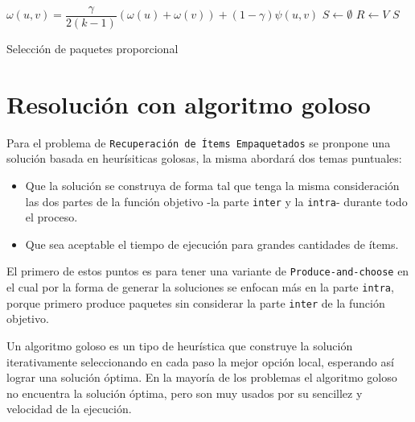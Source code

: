 \begin{center}
	\begin{algorithm}[H]
	\DontPrintSemicolon
	\SetAlgoLined
		$\omega(u,v) = \dfrac{\gamma}{2( k - 1)} (\omega(u) + \omega(v)) + (1 - \gamma)\psi(u,v)$\;
		$S \leftarrow \emptyset$\;
		$R \leftarrow V$\;
		\Return $S$\;
	\caption{Selección de paquetes proporcional}\label{alg:algSelProp}
	\end{algorithm}
\end{center}

\section{Resolución con algoritmo goloso}

Para el problema de \texttt{Recuperación de Ítems Empaquetados} se pronpone una solución basada en heurísiticas golosas, la misma abordará dos temas puntuales:
\begin{itemize}
	\item Que la solución se construya de forma tal que tenga la misma consideración las dos partes de la función objetivo -la parte \texttt{inter} y la \texttt{intra}- durante todo el proceso.
	\item Que sea aceptable el tiempo de ejecución para grandes cantidades de ítems.
\end{itemize}

El primero de estos puntos es para tener una variante de \texttt{Produce-and-choose} en el cual por la forma de generar la soluciones se enfocan más en la parte \texttt{intra}, porque primero produce paquetes sin considerar la parte \texttt{inter} de la función objetivo.

Un algoritmo goloso es un tipo de heurística que construye la solución iterativamente seleccionando en cada paso la mejor opción local, esperando así lograr una solución óptima. En la mayoría de los problemas el algoritmo goloso no encuentra la solución óptima, pero son muy usados por su sencillez y velocidad de la ejecución.

